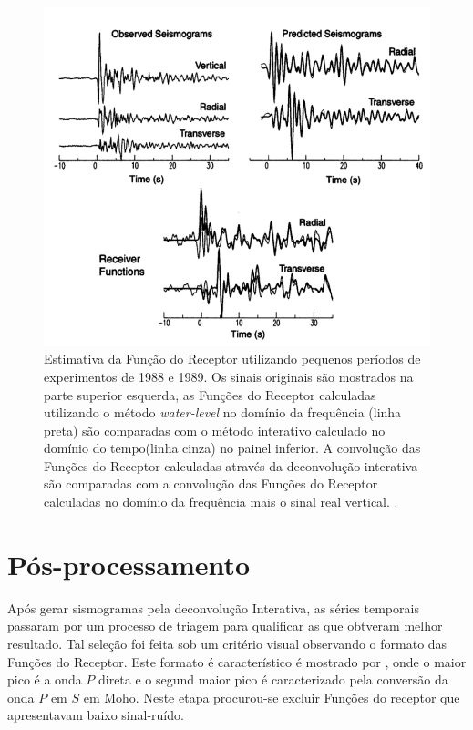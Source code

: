 \begin{figure}[!ht]
\centering
\includegraphics[scale=0.5]{Figs/deconvolucao_interativa.png}
\caption[Estimativa da Função do Receptor utilizando pequenos períodos.]{Estimativa da Função do Receptor utilizando pequenos períodos de experimentos de 1988 e 1989. Os sinais originais são mostrados na parte superior esquerda, as Funções do Receptor calculadas utilizando o método \textit{water-level} no domínio da frequência (linha preta) são comparadas com o método interativo calculado no domínio do tempo(linha cinza) no painel inferior. A convolução das Funções do Receptor calculadas através da deconvolução interativa são comparadas com a convolução das Funções do Receptor calculadas no domínio da frequência mais o sinal real vertical. \citep{ligorria_iterative_1999}.}
\label{deconvolucao_interativa}
\end{figure}

\section{Pós-processamento}

Após gerar sismogramas pela deconvolução Interativa, as séries temporais passaram por um processo de triagem para qualificar as que obtveram melhor resultado. Tal seleção foi feita sob um critério visual observando o formato das Funções do Receptor. Este formato é característico é mostrado por \citep{langston_structure_1979}, onde o maior pico é a onda $P$ direta e o segund maior pico é caracterizado pela conversão da onda $P$ em $S$ em Moho. Neste etapa procurou-se excluir Funções do receptor que apresentavam baixo sinal-ruído.

